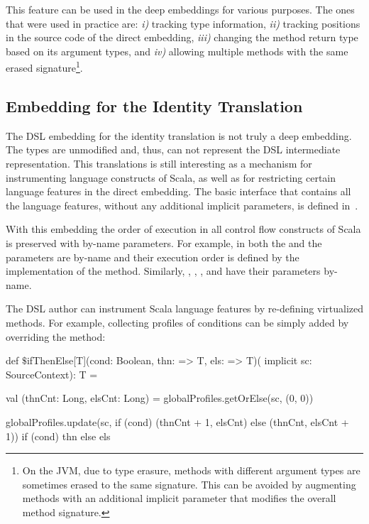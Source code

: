 
This feature can be used in the deep embeddings for various purposes. The ones that
were used in practice are: \emph{i)} tracking type information, \emph{ii)} tracking
positions in the source code of the direct embedding, \emph{iii)} changing the method return type
based on its argument types, and \emph{iv)} allowing multiple methods with the
same erased signature\footnote{On the JVM, due to type erasure, methods with different
 argument types are sometimes erased to the same signature. This can be avoided by augmenting
 methods with an additional implicit parameter that modifies the overall method signature.}.


\subsection{Embedding for the Identity Translation}
\label{sec:identity-embedding}

The DSL embedding for the identity translation is not truly a deep embedding. The
types are unmodified and, thus, can not represent the DSL intermediate representation.
This translations is still interesting as a mechanism for instrumenting language
constructs of Scala, as well as for restricting certain language features in the direct embedding. The
basic interface that contains all the language features, without any additional implicit parameters,
is defined in~.

With this embedding the order of execution in all control flow constructs of Scala is preserved with
 by-name parameters. For example, in  both the  and the  parameters
are by-name and their execution order is defined by the implementation of the method. Similarly,
, , , and  have their
 parameters by-name.

The DSL author can instrument Scala language features by re-defining virtualized methods. For example,
 collecting profiles of  conditions can be simply added by overriding the
 method:\begin{lstparagraph}
def $\$$ifThenElse[T](cond: Boolean, thn: => T, els: => T)(
  implicit sc: SourceContext): T = {
  val (thnCnt: Long, elsCnt: Long) =
    globalProfiles.getOrElse(sc, (0, 0))

  globalProfiles.update(sc,
    if (cond) (thnCnt + 1, elsCnt)
    else (thnCnt, elsCnt + 1))
  if (cond) thn else els
}
\end{lstparagraph}

